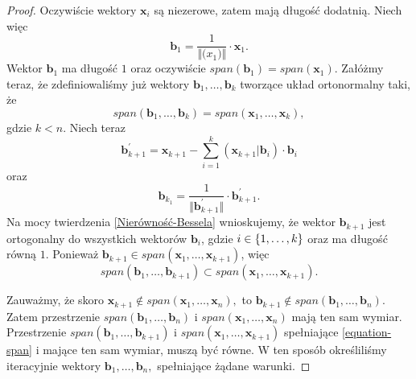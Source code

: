 \documentclass[12pt,a4paper]{report}
\newcommand{\vr}[1]{\mathbf{#1}}
\begin{document}
\begin{proof}
Oczywiście wektory $\vr{x}_{i}$ są niezerowe, zatem mają długość dodatnią. Niech więc
$$
\vr{b}_{1}=\frac{1}{\Vert\vr(x_{1})\Vert}\cdot\vr{x}_{1}.
$$
Wektor $\vr{b}_{1}$ ma długość $1$ oraz oczywiście $span(\vr{b}_{1}) = span (\vr{x}_{1})$. Załóżmy teraz, że zdefiniowaliśmy już wektory $\vr{b}_{1}, \ldots, \vr{b}_{k}$ tworzące układ ortonormalny taki, że
$$
span(\vr{b}_{1}, \ldots, \vr{b}_{k}) = span(\vr{x}_{1}, \ldots, \vr{x}_{k}),
$$
gdzie $k < n$.
Niech teraz 
$$
\vr{b}_{k+1}^{'} = \vr{x}_{k+1} - \sum_{i=1}^{k}(\vr{x}_{k+1}|\vr{b}_{i})\cdot \vr{b}_{i}
$$
oraz
$$
\vr{b}_{k_1} = \frac{1}{\Vert \vr{b}_{k+1}^{'} \Vert} \cdot \vr{b}_{k+1}^{'}.
$$
Na mocy twierdzenia \ref{Nierówność-Bessela} wnioskujemy, że wektor $\vr{b}_{k+1}$ jest ortogonalny do wszystkich wektorów $\vr{b}_{i}$, gdzie $i\in \left\lbrace {1, \ldots, k} \right\rbrace$ oraz ma długość równą $1$. Ponieważ $\vr{b}_{k+1}\in span(\vr{x}_{1}, \ldots, \vr{x}_{k+1})$, więc
\begin{equation} \label{equation-span}
span(\vr{b}_{1}, \ldots, \vr{b}_{k+1}) \subset span(\vr{x}_{1}, \ldots, \vr{x}_{k+1}).
\end{equation}

Zauważmy, że skoro $\vr{x}_{k+1} \notin span(\vr{x}_{1}, \ldots, \vr{x}_{n}),$ to $\vr{b}_{k+1} \notin span (\vr{b}_{1}, \ldots, \vr{b}_{n}).$ Zatem przestrzenie $span(\vr{b}_{1}, \ldots, \vr{b}_{n})$ i $span(\vr{x}_{1}, \ldots, \vr{x}_{n})$ mają ten sam wymiar.
Przestrzenie $span(\vr{b}_{1}, \ldots, \vr{b}_{k+1})$ i $span(\vr{x}_{1}, \ldots, \vr{x}_{k+1})$ spełniające \eqref{equation-span} i mające ten sam wymiar, muszą być równe.
W ten sposób określiliśmy iteracyjnie wektory $\vr{b}_{1}, \ldots, \vr{b}_{n},$ spełniające żądane warunki.
\end{proof}
\end{document}
